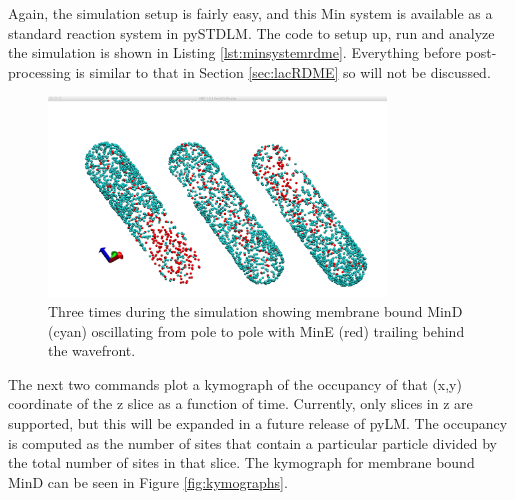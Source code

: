 Again, the simulation setup is fairly easy, and this Min system is available as a standard reaction system in pySTDLM.  The code to setup up, run and analyze the simulation is shown in Listing \ref{lst:minsystemrdme}.  Everything before post-processing is similar to that in Section \ref{sec:lacRDME} so will not be discussed. 



\begin{figure}[h!]
  \centering
        \includegraphics[width=0.8\textwidth]{Figures/MinDESnapshots.png}
        \caption{Three times during the simulation showing membrane bound MinD (cyan) oscillating from pole to pole with MinE (red) trailing behind the wavefront.} \label{fig:mindegraph}
\end{figure}

The next two commands plot a kymograph of the occupancy of that (x,y) coordinate of the z slice as a function of time.  Currently, only slices in z are supported, but this will be expanded in a future release of pyLM.  The occupancy is computed as the number of sites that contain a particular particle divided by the total number of sites in that slice.   The kymograph for membrane bound MinD  can be seen in Figure \ref{fig:kymographs}.  

